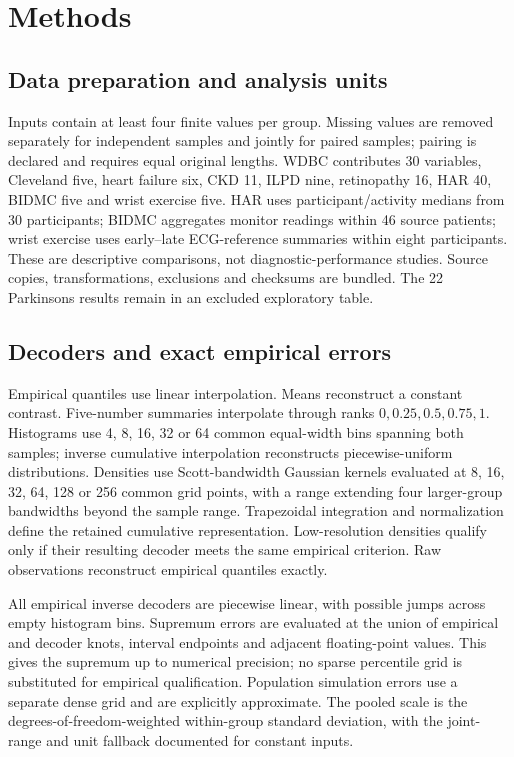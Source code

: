 \documentclass[11pt]{article}
\begin{document}
\section*{Methods}
\subsection*{Data preparation and analysis units}
Inputs contain at least four finite values per group. Missing values are removed separately for independent samples and jointly for paired samples; pairing is declared and requires equal original lengths. WDBC contributes 30 variables, Cleveland five, heart failure six, CKD 11, ILPD nine, retinopathy 16, HAR 40, BIDMC five and wrist exercise five. HAR uses participant/activity medians from 30 participants; BIDMC aggregates monitor readings within 46 source patients; wrist exercise uses early--late ECG-reference summaries within eight participants.\cite{pimentel2017,jarchi2017} These are descriptive comparisons, not diagnostic-performance studies. Source copies, transformations, exclusions and checksums are bundled. The 22 Parkinsons results remain in an excluded exploratory table.

\subsection*{Decoders and exact empirical errors}
Empirical quantiles use linear interpolation. Means reconstruct a constant contrast. Five-number summaries interpolate through ranks $0,0.25,0.5,0.75,1$. Histograms use 4, 8, 16, 32 or 64 common equal-width bins spanning both samples; inverse cumulative interpolation reconstructs piecewise-uniform distributions. Densities use Scott-bandwidth Gaussian kernels evaluated at 8, 16, 32, 64, 128 or 256 common grid points, with a range extending four larger-group bandwidths beyond the sample range. Trapezoidal integration and normalization define the retained cumulative representation. Low-resolution densities qualify only if their resulting decoder meets the same empirical criterion. Raw observations reconstruct empirical quantiles exactly.

All empirical inverse decoders are piecewise linear, with possible jumps across empty histogram bins. Supremum errors are evaluated at the union of empirical and decoder knots, interval endpoints and adjacent floating-point values. This gives the supremum up to numerical precision; no sparse percentile grid is substituted for empirical qualification. Population simulation errors use a separate dense grid and are explicitly approximate. The pooled scale is the degrees-of-freedom-weighted within-group standard deviation, with the joint-range and unit fallback documented for constant inputs.
\end{document}
